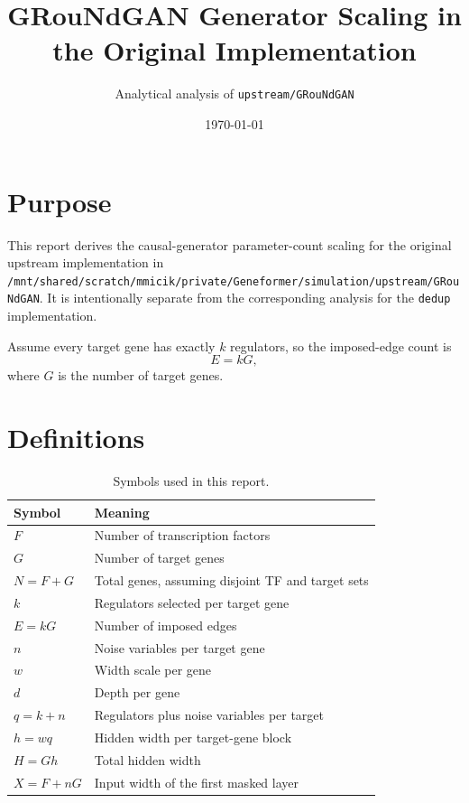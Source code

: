 \documentclass[11pt]{article}
\title{GRouNdGAN Generator Scaling in the Original Implementation}
\author{Analytical analysis of \texttt{upstream/GRouNdGAN}}
\date{\today}
\begin{document}
\maketitle

\section{Purpose}

This report derives the causal-generator parameter-count scaling for the original upstream
implementation in \texttt{/mnt/shared/scratch/mmicik/private/Geneformer/simulation/upstream/GRouNdGAN}.
It is intentionally separate from the corresponding analysis for the \texttt{dedup} implementation.

Assume every target gene has exactly $k$ regulators, so the imposed-edge count is
\begin{equation}
E=kG,
\end{equation}
where $G$ is the number of target genes.

\section{Definitions}

\begin{table}[H]
\centering
\caption{Symbols used in this report.}
\begin{tabular}{ll}
\toprule
Symbol & Meaning \\
\midrule
$F$ & Number of transcription factors \\
$G$ & Number of target genes \\
$N=F+G$ & Total genes, assuming disjoint TF and target sets \\
$k$ & Regulators selected per target gene \\
$E=kG$ & Number of imposed edges \\
$n$ & Noise variables per target gene \\
$w$ & Width scale per gene \\
$d$ & Depth per gene \\
$q=k+n$ & Regulators plus noise variables per target \\
$h=wq$ & Hidden width per target-gene block \\
$H=Gh$ & Total hidden width \\
$X=F+nG$ & Input width of the first masked layer \\
\bottomrule
\end{tabular}
\end{table}
\end{document}
